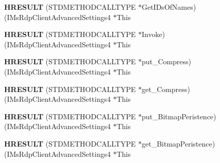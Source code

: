 \begin{DoxyCompactItemize}
\item 
\mbox{\label{struct_i_ms_rdp_client_advanced_settings4_vtbl_a20b1b57c250b1499662867991fe8afee}} 
{\bfseries H\+R\+E\+S\+U\+LT} (S\+T\+D\+M\+E\+T\+H\+O\+D\+C\+A\+L\+L\+T\+Y\+PE $\ast$Get\+I\+Ds\+Of\+Names)(I\+Ms\+Rdp\+Client\+Advanced\+Settings4 $\ast$This
\item 
\mbox{\label{struct_i_ms_rdp_client_advanced_settings4_vtbl_af0fee21760a1e4cf78da31465b16b94b}} 
{\bfseries H\+R\+E\+S\+U\+LT} (S\+T\+D\+M\+E\+T\+H\+O\+D\+C\+A\+L\+L\+T\+Y\+PE $\ast$Invoke)(I\+Ms\+Rdp\+Client\+Advanced\+Settings4 $\ast$This
\item 
\mbox{\label{struct_i_ms_rdp_client_advanced_settings4_vtbl_aea29771e5817f27d3cd1335237f7f4da}} 
{\bfseries H\+R\+E\+S\+U\+LT} (S\+T\+D\+M\+E\+T\+H\+O\+D\+C\+A\+L\+L\+T\+Y\+PE $\ast$put\+\_\+\+Compress)(I\+Ms\+Rdp\+Client\+Advanced\+Settings4 $\ast$This
\item 
\mbox{\label{struct_i_ms_rdp_client_advanced_settings4_vtbl_aefb6cd27b4f22f5def7544e26a4ee007}} 
{\bfseries H\+R\+E\+S\+U\+LT} (S\+T\+D\+M\+E\+T\+H\+O\+D\+C\+A\+L\+L\+T\+Y\+PE $\ast$get\+\_\+\+Compress)(I\+Ms\+Rdp\+Client\+Advanced\+Settings4 $\ast$This
\item 
\mbox{\label{struct_i_ms_rdp_client_advanced_settings4_vtbl_a412fe66ebd1cc79ddbdd14336e15e265}} 
{\bfseries H\+R\+E\+S\+U\+LT} (S\+T\+D\+M\+E\+T\+H\+O\+D\+C\+A\+L\+L\+T\+Y\+PE $\ast$put\+\_\+\+Bitmap\+Peristence)(I\+Ms\+Rdp\+Client\+Advanced\+Settings4 $\ast$This
\item 
\mbox{\label{struct_i_ms_rdp_client_advanced_settings4_vtbl_a70fd52c4300ae29b8a0e1f24eb667e1c}} 
{\bfseries H\+R\+E\+S\+U\+LT} (S\+T\+D\+M\+E\+T\+H\+O\+D\+C\+A\+L\+L\+T\+Y\+PE $\ast$get\+\_\+\+Bitmap\+Peristence)(I\+Ms\+Rdp\+Client\+Advanced\+Settings4 $\ast$This
\item 
\mbox{\label{struct_i_ms_rdp_client_advanced_settings4_vtbl_a8c1bd3d4c84c80d18557693875b895ea}} 

\end{DoxyCompactItemize}
